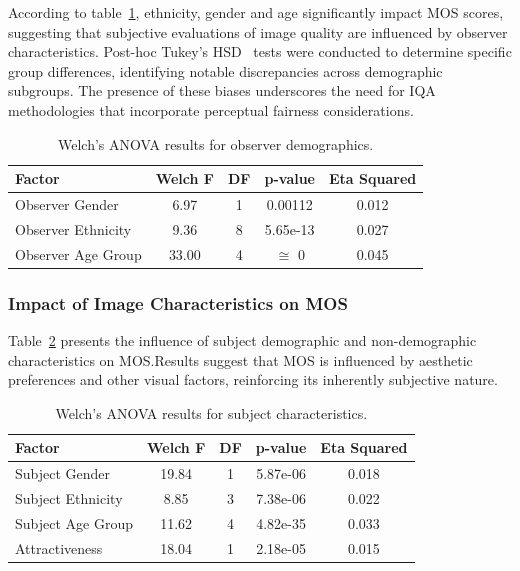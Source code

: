 According to table~\ref{tab:anova_observer}, ethnicity, gender and age significantly impact MOS scores, suggesting that subjective evaluations of image quality are influenced by observer characteristics. Post-hoc Tukey's HSD~\cite{tukey1949comparing} tests were conducted to determine specific group differences, identifying notable discrepancies across demographic subgroups. The presence of these biases underscores the need for IQA methodologies that incorporate perceptual fairness considerations.


\begin{table}[!htbp]
\caption{Welch's ANOVA results for observer demographics.}
\begin{center}
\begin{tabular}{|l|c|c|c|c|}
\hline
\textbf{Factor} & \textbf{Welch F} & \textbf{DF} & \textbf{p-value} & \textbf{Eta Squared}  \\
\hline
Observer Gender & 6.97 & 1 & 0.00112 & 0.012 \\ \hline
Observer Ethnicity & 9.36 & 8 & 5.65e-13 & 0.027 \\ \hline
Observer Age Group & 33.00 & 4 & $\cong$ 0 & 0.045 \\ \hline
\end{tabular}\label{tab:anova_observer}
\end{center}
\end{table}

\subsubsection{Impact of Image Characteristics on MOS}

Table~\ref{tab:anova_image} presents the influence of subject demographic and non-demographic characteristics on MOS.\@ Results suggest that MOS is influenced by aesthetic preferences and other visual factors, reinforcing its inherently subjective nature.

\begin{table}[!htbp]
\caption{Welch's ANOVA results for subject characteristics.}
\begin{center}
\begin{tabular}{|l|c|c|c|c|}
\hline
\textbf{Factor} & \textbf{Welch F} & \textbf{DF} & \textbf{p-value} & \textbf{Eta Squared} \\
\hline
Subject Gender & 19.84 & 1 & 5.87e-06 & 0.018 \\
\hline
Subject Ethnicity & 8.85 & 3 & 7.38e-06 & 0.022 \\
\hline
Subject Age Group & 11.62 & 4 & 4.82e-35 & 0.033 \\
\hline
Attractiveness & 18.04 & 1 & 2.18e-05 & 0.015 \\
\hline
\end{tabular}\label{tab:anova_image}
\end{center}
\end{table}


